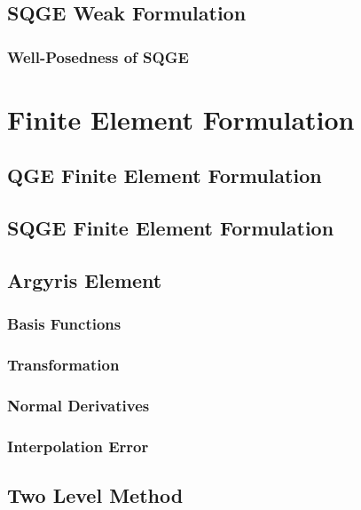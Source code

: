 \documentclass{VTthesis}
\begin{document}
    \section{SQGE Weak Formulation} \label{sec:SQGEWeak}
    
      \subsection{Well-Posedness of SQGE}
      

  \chapter{Finite Element Formulation} \label{ch:FEM}
    \section{QGE Finite Element Formulation} \label{sec:QGEFEM}
    
    \section{SQGE Finite Element Formulation} \label{sec:SQGEFEM}
    
    \section{Argyris Element} \label{sec:Argyris}
    
      \subsection{Basis Functions} \label{sse:Basis}
      
      \subsection{Transformation} \label{sse:Trans}
      
      \subsection{Normal Derivatives} \label{sse:Normals}
      
      \subsection{Interpolation Error} \label{sse:IntErr}
      
    \section{Two Level Method} \label{sec:TwoLevel}
    
\end{document}
